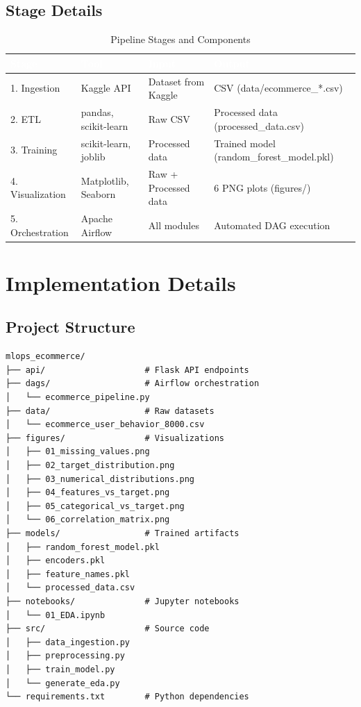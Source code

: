 \documentclass[11pt,a4paper]{article}
\begin{document}
\subsection{Stage Details}

\begin{table}[H]
\centering
\caption{Pipeline Stages and Components}
\small
\begin{tabular}{L{1.5cm} L{2cm} L{2.5cm} L{4.2cm}}
\toprule
{}
\textcolor{white}{\textbf{Stage}} &
\textcolor{white}{\textbf{Tool}} &
\textcolor{white}{\textbf{Input}} &
\textcolor{white}{\textbf{Output}} \\
. Ingestion
  & Kaggle API
  & Dataset from Kaggle
  & CSV (data/ecommerce\_*.csv) \\
2. ETL
  & pandas, scikit-learn
  & Raw CSV
  & Processed data (processed\_data.csv) \\
3. Training
  & scikit-learn, joblib
  & Processed data
  & Trained model (random\_forest\_model.pkl) \\
4. Visualization
  & Matplotlib, Seaborn
  & Raw + Processed data
  & 6 PNG plots (figures/) \\
5. Orchestration
  & Apache Airflow
  & All modules
  & Automated DAG execution \\
\bottomrule
\end{tabular}
\end{table}

\section{Implementation Details}

\subsection{Project Structure}

\begin{verbatim}
mlops_ecommerce/
├── api/                    # Flask API endpoints
├── dags/                   # Airflow orchestration
│   └── ecommerce_pipeline.py
├── data/                   # Raw datasets
│   └── ecommerce_user_behavior_8000.csv
├── figures/                # Visualizations
│   ├── 01_missing_values.png
│   ├── 02_target_distribution.png
│   ├── 03_numerical_distributions.png
│   ├── 04_features_vs_target.png
│   ├── 05_categorical_vs_target.png
│   └── 06_correlation_matrix.png
├── models/                 # Trained artifacts
│   ├── random_forest_model.pkl
│   ├── encoders.pkl
│   ├── feature_names.pkl
│   └── processed_data.csv
├── notebooks/              # Jupyter notebooks
│   └── 01_EDA.ipynb
├── src/                    # Source code
│   ├── data_ingestion.py
│   ├── preprocessing.py
│   ├── train_model.py
│   └── generate_eda.py
└── requirements.txt        # Python dependencies
\end{verbatim}
\end{document}
